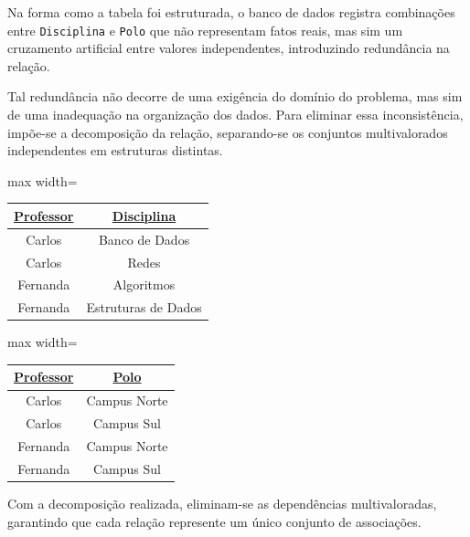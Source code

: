 \begin{tcolorbox}[breakable, colback=blue!5,colframe=blue!40!black,title=Situação exemplo]
Na forma como a tabela foi estruturada, o banco de dados registra combinações entre \texttt{Disciplina} e \texttt{Polo} que não representam fatos reais, mas sim um cruzamento artificial entre valores independentes, introduzindo redundância na relação.

Tal redundância não decorre de uma exigência do domínio do problema, mas sim de uma inadequação na organização dos dados. Para eliminar essa inconsistência, impõe-se a decomposição da relação, separando-se os conjuntos multivalorados independentes em estruturas distintas.

\vspace{0.5cm}

\centering
\renewcommand{\arraystretch}{1.2}

\begin{adjustbox}{max width=\textwidth}
\begin{tabular}{|c|c|}
\hline
\textbf{\underline{Professor}} & \textbf{\underline{Disciplina}} \\ \hline
Carlos & Banco de Dados \\ \hline
Carlos & Redes \\ \hline
Fernanda & Algoritmos \\ \hline
Fernanda & Estruturas de Dados \\ \hline
\end{tabular}
\end{adjustbox}
\vspace{0.3cm}
\label{tab:4fn_prof_disc}

\vspace{0.5cm}

\begin{adjustbox}{max width=\textwidth}
\begin{tabular}{|c|c|}
\hline
\textbf{\underline{Professor}} & \textbf{\underline{Polo}} \\ \hline
Carlos & Campus Norte \\ \hline
Carlos & Campus Sul \\ \hline
Fernanda & Campus Norte \\ \hline
Fernanda & Campus Sul \\ \hline
\end{tabular}
\end{adjustbox}\vspace{0.3cm}
\label{tab:4fn_prof_polo}

\vspace{0.4cm}

\justify

Com a decomposição realizada, eliminam-se as dependências multivaloradas, garantindo que cada relação represente um único conjunto de associações. 

\end{tcolorbox}

